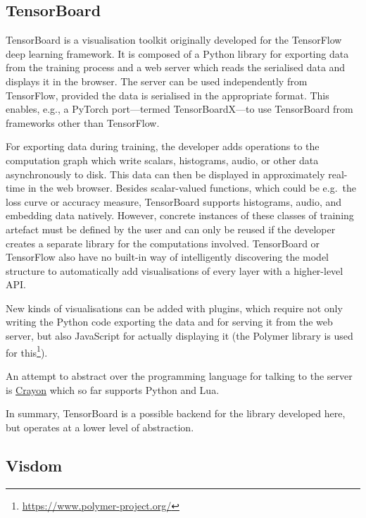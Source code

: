 \hypertarget{tensorboard}{%
\subsection*{TensorBoard}\label{tensorboard}}

TensorBoard is a visualisation toolkit originally developed for the TensorFlow
\citep{tensorflow2015-whitepaper} deep learning framework. It is composed of a
Python library for exporting data from the training process and a web server
which reads the serialised data and displays it in the browser. The server can
be used independently from TensorFlow, provided the data is serialised in the
appropriate format. This enables, e.g., a PyTorch port---termed TensorBoardX---to
use TensorBoard from frameworks other than TensorFlow.

For exporting data during training, the developer adds operations to the
computation graph which write scalars, histograms, audio, or other data
asynchronously to disk. This data can then be displayed in approximately
real-time in the web browser. Besides scalar-valued functions, which
could be e.g.~the loss curve or accuracy measure, TensorBoard supports
histograms, audio, and embedding data natively. However, concrete
instances of these classes of training artefact must be defined by the
user and can only be reused if the developer creates a separate library
for the computations involved. TensorBoard or TensorFlow also have no built-in
way of intelligently discovering the model structure to automatically add
visualisations of every layer with a higher-level API.

New kinds of visualisations can be added with plugins, which require not
only writing the Python code exporting the data and for serving it from
the web server, but also JavaScript for actually displaying it (the
Polymer library is used for this\footnote{\url{https://www.polymer-project.org/}}).

An attempt to abstract over the programming language for talking to
the server is \href{https://github.com/torrvision/crayon}{Crayon} which
so far supports Python and Lua.

In summary, TensorBoard is a possible backend for the library developed here,
but operates at a lower level of abstraction.

\hypertarget{visdom}{%
\subsection*{Visdom}\label{visdom}}

